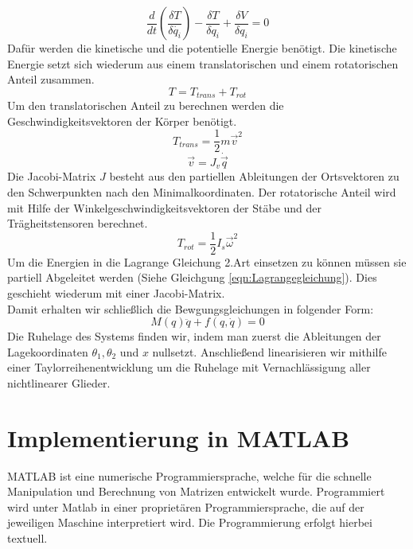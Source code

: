 \documentclass[a4paper, 10pt]{report}
\begin{document}
\begin{equation}
\label{eqn:Lagrangegleichung}
\dfrac{d}{dt}(\dfrac{\delta T}{\delta \dot{q_{i}}})-\dfrac{\delta T}{\delta q_{i}}+\dfrac{\delta V}{\delta q_{i}}=0
\end{equation}
Dafür werden die kinetische und die potentielle Energie benötigt. Die kinetische Energie setzt sich wiederum aus einem translatorischen und einem rotatorischen Anteil zusammen.
\begin{equation}
T=T_{trans}+T_{rot} 
\end{equation}
Um den translatorischen Anteil zu berechnen werden die Geschwindigkeitsvektoren der Körper benötigt.
\begin{equation}
T_{trans}=\dfrac{1}{2} m \vec{v}^{2} 
\end{equation}
\begin{equation}
\vec{v}=J_{v}\dot{\vec{q}}
\end{equation}
Die Jacobi-Matrix $J$ besteht aus den partiellen Ableitungen der Ortsvektoren zu den Schwerpunkten nach den Minimalkoordinaten.
Der rotatorische Anteil wird mit Hilfe der Winkelgeschwindigkeitsvektoren der Stäbe und der Trägheitstensoren berechnet.
\begin{equation}
T_{rot}=\dfrac{1}{2} I_{s} \vec{\omega}^{2}
\end{equation}
Um die Energien in die Lagrange Gleichung 2.Art einsetzen zu können müssen sie partiell Abgeleitet werden (Siehe Gleichgung \ref{eqn:Lagrangegleichung}). Dies geschieht wiederum mit einer Jacobi-Matrix. \\
Damit erhalten wir schließlich die Bewgungsgleichungen in folgender Form:
\begin{equation}
M(q)\ddot{q} + f(q,\dot{q}) = 0
\end{equation}
Die Ruhelage des Systems finden wir, indem man zuerst die Ableitungen der Lagekoordinaten $\theta_{1}, \theta_{2}$ und $x$ nullsetzt. Anschließend linearisieren wir mithilfe einer Taylorreihenentwicklung um die Ruhelage mit Vernachlässigung aller nichtlinearer Glieder.
\chapter{Implementierung in MATLAB}
%
%
MATLAB ist eine numerische Programmiersprache, welche für die schnelle Manipulation und Berechnung von Matrizen entwickelt wurde. Programmiert wird unter Matlab in einer proprietären Programmiersprache, die auf der jeweiligen Maschine interpretiert wird. Die Programmierung erfolgt hierbei textuell.
\end{document}
